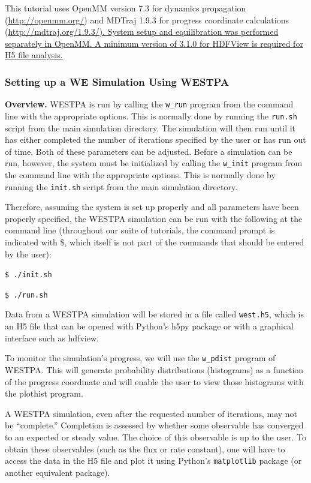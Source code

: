 \documentclass[9pt,tutorial,ASAPversion]{livecoms}
\begin{document}
This tutorial uses OpenMM version 7.3 for dynamics propagation (\url{http://openmm.org/}) and MDTraj 1.9.3 for progress coordinate calculations (\url{http://mdtraj.org/1.9.3/). System setup and equilibration was performed separately in OpenMM. A minimum version of 3.1.0 for HDFView is required for H5 file analysis.}

\subsubsection{Setting up a WE Simulation Using WESTPA}

\textbf{Overview.} WESTPA is run by calling the \verb|w_run| program from the command line with the appropriate options. 
This is normally done by running the \verb|run.sh| script from the main simulation directory. 
The simulation will then run until it has either completed the number of iterations specified by the user or has run out of time. 
Both of these parameters can be adjusted. 
Before a simulation can be run, however, the system must be initialized by calling the \verb|w_init| program from the command line with the appropriate options. 
This is normally done by running the \verb|init.sh| script from the main simulation directory.

Therefore, assuming the system is set up properly and all parameters have been properly specified, the WESTPA simulation can be run with the following at the command line (throughout our suite of tutorials, the command prompt is indicated with \$, which itself is not part of the commands that should be entered by the user):
 
\verb|$ ./init.sh|

\verb|$ ./run.sh|
 
Data from a WESTPA simulation will be stored in a file called \verb|west.h5|, which is an H5 file that can be opened with Python’s h5py package or with a graphical interface such as hdfview.

To monitor the simulation’s progress, we will use  the \verb|w_pdist| program of WESTPA. 
This will generate probability distributions (histograms) as a function of the progress coordinate and will enable the user to view those histograms with the plothist program. 

A WESTPA simulation, even after the requested number of iterations, may not be “complete.”  
Completion is assessed by whether some observable has converged to an expected or steady value. 
The choice of this observable is up to the user. 
To obtain these observables (such as the flux or rate constant), one will have to access the data in the H5 file and plot it using Python’s \verb|matplotlib| package (or another equivalent package).
\end{document}
